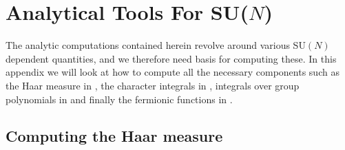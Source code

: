 \chapter{Analytical Tools For SU(\texorpdfstring{$N$}{N})}

The analytic computations contained herein revolve around various SU$(N)$
dependent quantities, and we therefore need basis for computing these. In this
appendix we will look at how to compute all the necessary components such as the
Haar measure in , the character integrals in
, integrals over group polynomials in
 and finally the fermionic functions in
.

\section{Computing the Haar measure} \label{sec-haar_measure}

